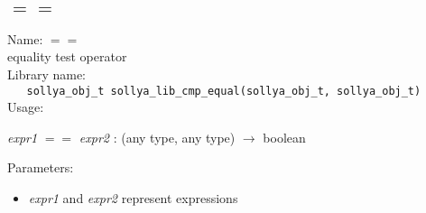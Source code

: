 \subsection{$==$}
\label{labequal}
\noindent Name: \textbf{$==$}\\
\phantom{aaa}equality test operator\\[0.2cm]
\noindent Library name:\\
\verb|   sollya_obj_t sollya_lib_cmp_equal(sollya_obj_t, sollya_obj_t)|\\[0.2cm]
\noindent Usage: 
\begin{center}
\emph{expr1} \textbf{$==$} \emph{expr2} : (\textsf{any type}, \textsf{any type}) $\rightarrow$ \textsf{boolean}\\
\end{center}
Parameters: 
\begin{itemize}
\item \emph{expr1} and \emph{expr2} represent expressions
\end{itemize}
